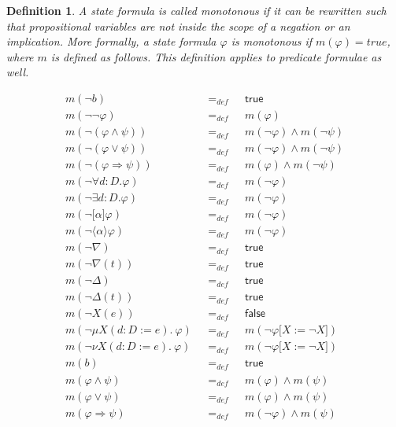 \documentclass{article}
\newtheorem{definition}[theorem]{Definition}
\begin{document}
\begin{definition}
A state formula is called \emph{monotonous} if it can be rewritten such that
propositional variables are not inside the scope of a negation or an
implication. More formally, a state formula $\varphi $ is monotonous if $%
m(\varphi )=true$, where $m$ is defined as follows. This definition applies
to predicate formulae as well.
\end{definition}

\begin{equation*}
\begin{array}{lll}
m(\lnot b) & =_{def} & \mathsf{true} \\ 
m(\lnot \lnot \varphi ) & =_{def} & m(\varphi ) \\ 
m(\lnot (\varphi \wedge \psi )) & =_{def} & m(\lnot \varphi )\wedge m(\lnot
\psi ) \\ 
m(\lnot (\varphi \vee \psi )) & =_{def} & m(\lnot \varphi )\wedge m(\lnot
\psi ) \\ 
m(\lnot (\varphi \Rightarrow \psi )) & =_{def} & m(\varphi )\wedge m(\lnot
\psi ) \\ 
m(\lnot \forall d{{:}D}.\varphi ) & =_{def} & m(\lnot \varphi ) \\ 
m(\lnot \exists d{{:}D}.\varphi ) & =_{def} & m(\lnot \varphi ) \\ 
m(\lnot \lbrack \alpha ]\varphi ) & =_{def} & m(\lnot \varphi ) \\ 
m(\lnot \langle \alpha \rangle \varphi ) & =_{def} & m(\lnot \varphi ) \\ 
m(\lnot \nabla ) & =_{def} & \mathsf{true} \\ 
m(\lnot \nabla (t)) & =_{def} & \mathsf{true} \\ 
m(\lnot \Delta ) & =_{def} & \mathsf{true} \\ 
m(\lnot \Delta (t)) & =_{def} & \mathsf{true} \\ 
m(\lnot X(e)) & =_{def} & \mathsf{false} \\ 
m(\lnot \mu X(d{:}D:=e).~\varphi )~~~ & =_{def}~~~ & m(\lnot \varphi \lbrack
X:=\lnot X]) \\ 
m(\lnot \nu X(d{:}D:=e).~\varphi )~~~ & =_{def}~~~ & m(\lnot \varphi \lbrack
X:=\lnot X]) \\ 
m(b) & =_{def} & \mathsf{true} \\ 
m(\varphi \wedge \psi ) & =_{def} & m(\varphi )\wedge m(\psi ) \\ 
m(\varphi \vee \psi ) & =_{def} & m(\varphi )\wedge m(\psi ) \\ 
m(\varphi \Rightarrow \psi ) & =_{def} & m(\lnot \varphi )\wedge m(\psi ) \\ 

\end{array}
\end{equation*}
\end{document}
